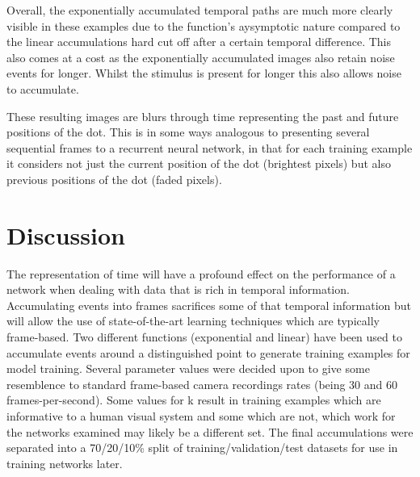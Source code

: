 Overall, the exponentially accumulated temporal paths are much more clearly visible in these examples due to the function's aysymptotic nature compared to the linear accumulations hard cut off after a certain temporal difference. 
This also comes at a cost as the exponentially accumulated images also retain noise events for longer.
Whilst the stimulus is present for longer this also allows noise to accumulate. 

These resulting images are blurs through time representing the past and future positions of the dot.
This is in some ways analogous to presenting several sequential frames to a recurrent neural network, in that for each training example it considers not just the current position of the dot (brightest pixels) but also previous positions of the dot (faded pixels).
 

\section{Discussion}
The representation of time will have a profound effect on the performance of a network when dealing with data that is rich in temporal information. 
Accumulating events into frames sacrifices some of that temporal information but will allow the use of state-of-the-art learning techniques which are typically frame-based. 
Two different functions (exponential and linear) have been used to accumulate events around a distinguished point to generate training examples for model training. 
Several parameter values were decided upon to give some resemblence to standard frame-based camera recordings rates (being 30 and 60 frames-per-second).
Some values for k result in training examples which are informative to a human visual system and some which are not, which work for the networks examined may likely be a different set. 
The final accumulations were separated into a 70/20/10\% split of training/validation/test datasets for use in training networks later. 

 

